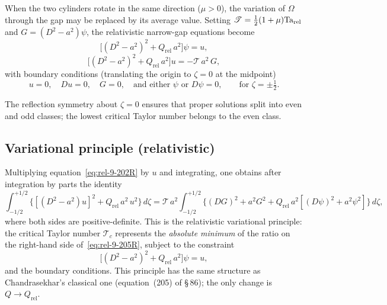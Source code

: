 When the two cylinders rotate in the same direction ($\mu>0$), the
variation of $\Omega$ through the gap may be replaced by its average
value.  Setting $\mathscr{T} = \tfrac{1}{2}(1+\mu)\mathrm{Ta}_{\mathrm{rel}}$
and $G = (D^2-a^2)\psi$, the relativistic narrow-gap equations become
\begin{equation}
  \bigl[(D^2-a^2)^2 + Q_{\mathrm{rel}}\,a^2\bigr]\psi = u,
  \label{eq:rel-9-201R}
\end{equation}
\begin{equation}
  \bigl[(D^2-a^2)^2 + Q_{\mathrm{rel}}\,a^2\bigr]u
  = -\mathscr{T}\,a^2\,G,
  \label{eq:rel-9-202R}
\end{equation}
with boundary conditions (translating the origin to $\zeta=0$ at the
midpoint)
\begin{equation}
  u = 0,\quad Du = 0,\quad G = 0,
  \quad\text{and either } \psi \text{ or } D\psi = 0,
  \qquad\text{for } \zeta = \pm\tfrac{1}{2}.
  \label{eq:rel-9-203R}
\end{equation}

The reflection symmetry about $\zeta=0$ ensures that proper solutions
split into even and odd classes; the lowest critical Taylor number
belongs to the even class.

\subsection{Variational principle (relativistic)}
\label{sec:rel-88-var}

Multiplying equation~\eqref{eq:rel-9-202R} by $u$ and integrating, one
obtains after integration by parts the identity
\begin{equation}
  \int_{-1/2}^{+1/2}\bigl\{[(D^2-a^2)u]^2
    + Q_{\mathrm{rel}}\,a^2\,u^2\bigr\}\,d\zeta
  = \mathscr{T}\,a^2\int_{-1/2}^{+1/2}\bigl\{(DG)^2 + a^2 G^2
    + Q_{\mathrm{rel}}\,a^2[(D\psi)^2+a^2\psi^2]\bigr\}\,d\zeta,
  \label{eq:rel-9-205R}
\end{equation}
where both sides are positive-definite.  This is the relativistic
variational principle: the critical Taylor number $\mathscr{T}_c$
represents the \emph{absolute minimum} of the ratio on the right-hand
side of~\eqref{eq:rel-9-205R}, subject to the constraint
\begin{equation}
  \bigl[(D^2-a^2)^2 + Q_{\mathrm{rel}}\,a^2\bigr]\psi = u,
  \label{eq:rel-9-206R}
\end{equation}
and the boundary conditions.  This principle has the same structure as
Chandrasekhar's classical one (equation~(205) of \S\,86); the only
change is $Q\to Q_{\mathrm{rel}}$.

